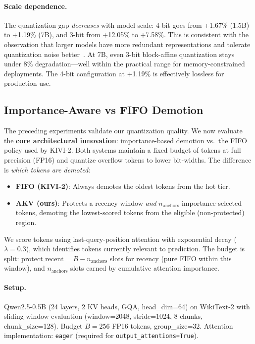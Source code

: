 \documentclass[11pt,a4paper]{article}
\begin{document}
\paragraph{Scale dependence.} The quantization gap \textit{decreases} with model scale: 4-bit goes from +1.67\% (1.5B) to +1.19\% (7B), and 3-bit from +12.05\% to +7.58\%. This is consistent with the observation that larger models have more redundant representations and tolerate quantization noise better~\cite{dettmers2022llm}. At 7B, even 3-bit block-affine quantization stays under 8\% degradation---well within the practical range for memory-constrained deployments. The 4-bit configuration at +1.19\% is effectively lossless for production use.

\subsection{Importance-Aware vs FIFO Demotion}
\label{sec:importance_demotion}

The preceding experiments validate our quantization quality. We now evaluate the \textbf{core architectural innovation}: importance-based demotion vs.\ the FIFO policy used by KIVI-2. Both systems maintain a fixed budget of tokens at full precision (FP16) and quantize overflow tokens to lower bit-widths. The difference is \textit{which tokens are demoted}:

\begin{itemize}
    \item \textbf{FIFO (KIVI-2)}: Always demotes the oldest tokens from the hot tier.
    \item \textbf{AKV (ours)}: Protects a recency window \textit{and} $n_{\text{anchors}}$ importance-selected tokens, demoting the lowest-scored tokens from the eligible (non-protected) region.
\end{itemize}

We score tokens using last-query-position attention with exponential decay ($\lambda = 0.3$), which identifies tokens currently relevant to prediction. The budget is split: $\text{protect\_recent} = B - n_{\text{anchors}}$ slots for recency (pure FIFO within this window), and $n_{\text{anchors}}$ slots earned by cumulative attention importance.

\paragraph{Setup.} Qwen2.5-0.5B (24 layers, 2 KV heads, GQA, head\_dim=64) on WikiText-2 with sliding window evaluation (window=2048, stride=1024, 8 chunks, chunk\_size=128). Budget $B = 256$ FP16 tokens, group\_size=32. Attention implementation: \texttt{eager} (required for \texttt{output\_attentions=True}).
\end{document}
